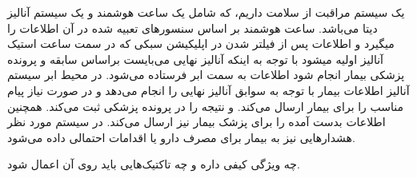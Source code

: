 
یک سیستم مراقبت از سلامت داریم، که شامل یک ساعت هوشمند و یک سیستم آنالیز دیتا
می‌باشد. ساعت هوشمند بر اساس سنسور‌های تعبیه شده در آن اطلاعات را میگیرد و
اطلاعات پس از فیلتر شدن در اپلیکیشن سبکی که در سمت ساعت استیک آنالیز اولیه میشود
با توجه به اینکه آنالیز نهایی می‌بایست براساس سابقه و پرونده پزشکی بیمار انجام
شود اطلاعات به سمت ابر فرستاده می‌شود. در محیط ابر سیستم آنالیز اطلاعات بیمار با
توجه به سوابق آنالیز نهایی را انجام می‌دهد و در صورت نیاز پیام مناسب را برای
بیمار ارسال می‌کند. و نتیجه را در پرونده پزشکی ثبت می‌کند. همچنین اطلاعات بدست
آمده را برای پزشک بیمار نیز ارسال می‌کند. در سیستم مورد نظر هشدار‌هایی نیز به
بیمار برای مصرف دارو یا اقدامات احتمالی داده می‌شود.

چه ویژگی کیفی داره و چه تاکتیک‌هایی باید روی آن اعمال شود.
